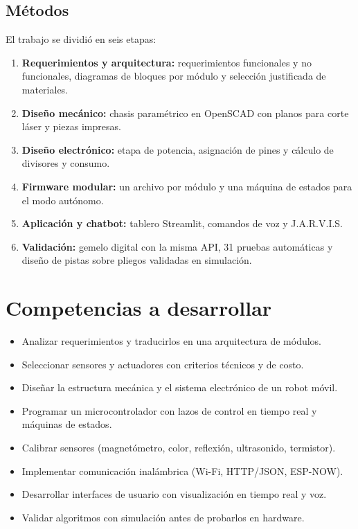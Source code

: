 \documentclass[10pt,a4paper,twocolumn]{article}
\begin{document}
\subsection{Métodos}
El trabajo se dividió en seis etapas:
\begin{enumerate}
\item \textbf{Requerimientos y arquitectura:} requerimientos funcionales y no funcionales, diagramas de bloques por módulo y selección justificada de materiales.
\item \textbf{Diseño mecánico:} chasis paramétrico en OpenSCAD con planos para corte láser y piezas impresas.
\item \textbf{Diseño electrónico:} etapa de potencia, asignación de pines y cálculo de divisores y consumo.
\item \textbf{Firmware modular:} un archivo por módulo y una máquina de estados para el modo autónomo.
\item \textbf{Aplicación y chatbot:} tablero Streamlit, comandos de voz y J.A.R.V.I.S.
\item \textbf{Validación:} gemelo digital con la misma API, 31 pruebas automáticas y diseño de pistas sobre pliegos validadas en simulación.
\end{enumerate}

\section{Competencias a desarrollar}
\begin{itemize}
\item Analizar requerimientos y traducirlos en una arquitectura de módulos.
\item Seleccionar sensores y actuadores con criterios técnicos y de costo.
\item Diseñar la estructura mecánica y el sistema electrónico de un robot móvil.
\item Programar un microcontrolador con lazos de control en tiempo real y máquinas de estados.
\item Calibrar sensores (magnetómetro, color, reflexión, ultrasonido, termistor).
\item Implementar comunicación inalámbrica (Wi-Fi, HTTP/JSON, ESP-NOW).
\item Desarrollar interfaces de usuario con visualización en tiempo real y voz.
\item Validar algoritmos con simulación antes de probarlos en hardware.
\end{itemize}
\end{document}
